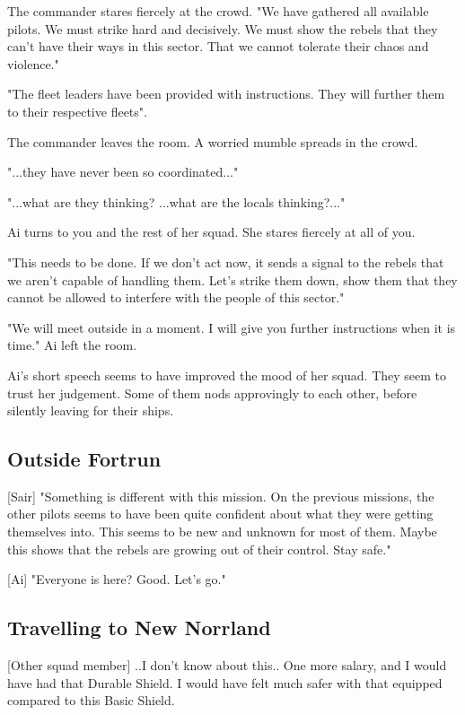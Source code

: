 \documentclass[a4paper,12pt]{article}
\begin{document}
The commander stares fiercely at the crowd. "We have gathered all available pilots. 
We must strike hard and decisively. We must show the rebels that they can't have their 
ways in this sector. That we cannot tolerate their chaos and violence."

"The fleet leaders have been provided with instructions. They will further them to
their respective fleets".

The commander leaves the room. A worried mumble spreads in the crowd.

"...they have never been so coordinated..."

"...what are they thinking? ...what are the locals thinking?..."

Ai turns to you and the rest of her squad. She stares fiercely at all of you.

"This needs to be done. If we don't act now, it sends a signal to the rebels that
we aren't capable of handling them. Let's strike them down, show them that they
cannot be allowed to interfere with the people of this sector."

"We will meet outside in a moment. I will give you further instructions when it is time."
Ai left the room.

Ai's short speech seems to have improved the mood of her squad. They seem to trust her
judgement. Some of them nods approvingly to each other, before silently leaving for their ships.

\subsection{Outside Fortrun}

[Sair] "Something is different with this mission. On the previous missions, the other pilots
seems to have been quite confident about what they were getting themselves into. This seems
to be new and unknown for most of them. Maybe this shows that the rebels are growing out
of their control. Stay safe."

[Ai] "Everyone is here? Good. Let's go."

\subsection{Travelling to New Norrland}

[Other squad member] ..I don't know about this.. One more salary, and I would have had that
Durable Shield. I would have felt much safer with that equipped compared to this Basic Shield.
\end{document}
